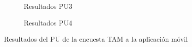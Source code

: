 \begin{figure}[H]
\begin{subfigure}[b]{0.4\textwidth}
        \caption{Resultados PU3}
    \end{subfigure}%
    \hfill
    \begin{subfigure}[b]{0.4\textwidth}
        \caption{Resultados PU4}
    \end{subfigure}%
    \caption{Resultados del PU de la encuesta TAM a la aplicación móvil}
    \label{fig:TAM-m-PU-Result}
\end{figure}

